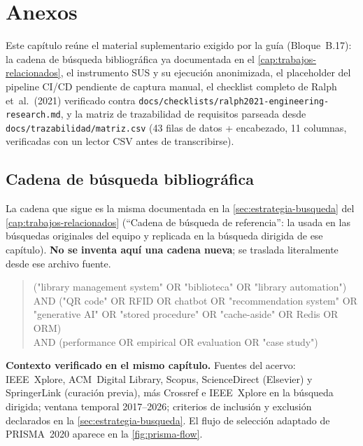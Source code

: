 \chapter{Anexos}

Este capítulo reúne el material suplementario exigido por la guía
(Bloque~B.17): la cadena de búsqueda bibliográfica ya documentada en el
\autoref{cap:trabajos-relacionados}, el instrumento SUS y su ejecución
anonimizada, el placeholder del pipeline CI/CD pendiente de
captura manual, el checklist completo de Ralph et~al.\ (2021) verificado
contra \texttt{docs/checklists/ralph2021-engineering-research.md}, y la
matriz de trazabilidad de requisitos parseada desde
\texttt{docs/trazabilidad/matriz.csv} (43 filas de datos + encabezado,
11 columnas, verificadas con un lector CSV antes de transcribirse).

\section{Cadena de búsqueda bibliográfica}

La cadena que sigue es la misma documentada en la
\autoref{sec:estrategia-busqueda} del \autoref{cap:trabajos-relacionados}
(``Cadena de búsqueda de referencia'': la usada en las búsquedas
originales del equipo y replicada en la búsqueda dirigida de ese
capítulo). \textbf{No se inventa aquí una cadena nueva}; se traslada
literalmente desde ese archivo fuente.

\begin{quote}
\ttfamily
("library management system" OR "biblioteca" OR "library automation")\\
AND ("QR code" OR RFID OR chatbot OR "recommendation system" OR\\
\phantom{AND (}"generative AI" OR "stored procedure" OR "cache-aside" OR Redis OR ORM)\\
AND (performance OR empirical OR evaluation OR "case study")
\end{quote}

\textbf{Contexto verificado en el mismo capítulo.} Fuentes del acervo:
IEEE~Xplore, ACM~Digital Library, Scopus, ScienceDirect (Elsevier) y
SpringerLink (curación previa), más Crossref e IEEE~Xplore en la
búsqueda dirigida; ventana temporal 2017--2026; criterios de inclusión y
exclusión declarados en la \autoref{sec:estrategia-busqueda}. El flujo de
selección adaptado de PRISMA~2020 aparece en la
\autoref{fig:prisma-flow}.

